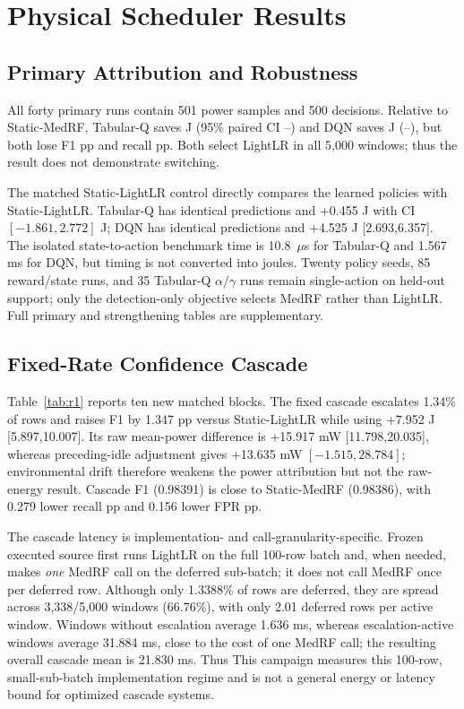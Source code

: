\section{Physical Scheduler Results}
\subsection{Primary Attribution and Robustness}
All forty primary runs contain 501 power samples and 500 decisions. Relative to Static-MedRF, Tabular-Q saves \TQSavingJ{} J (95\% paired CI \TQSavingJLow{}--\TQSavingJHigh{}) and DQN saves \DQSavingJ{} J (\DQSavingJLow{}--\DQSavingJHigh{}), but both lose \TQFOneDropPP{} F1 pp and \TQRecallDropPP{} recall pp. Both select LightLR in all 5,000 windows; thus the result does not demonstrate switching.

The matched Static-LightLR control directly compares the learned policies with Static-LightLR. Tabular-Q has identical predictions and +0.455 J with CI $[-1.861,2.772]$ J; DQN has identical predictions and +4.525 J [2.693,6.357]. The isolated state-to-action benchmark time is 10.8~$\mu$s for Tabular-Q and 1.567 ms for DQN, but timing is not converted into joules. Twenty policy seeds, 85 reward/state runs, and 35 Tabular-Q $\alpha/\gamma$ runs remain single-action on held-out support; only the detection-only objective selects MedRF rather than LightLR. Full primary and strengthening tables are supplementary.

\subsection{Fixed-Rate Confidence Cascade}
Table~\ref{tab:r1} reports ten new matched blocks. The fixed cascade escalates 1.34\% of rows and raises F1 by 1.347 pp versus Static-LightLR while using +7.952 J [5.897,10.007]. Its raw mean-power difference is +15.917 mW [11.798,20.035], whereas preceding-idle adjustment gives +13.635 mW $[-1.515,28.784]$; environmental drift therefore weakens the power attribution but not the raw-energy result. Cascade F1 (0.98391) is close to Static-MedRF (0.98386), with 0.279 lower recall pp and 0.156 lower FPR pp.

The cascade latency is implementation- and call-granularity-specific. Frozen executed source first runs LightLR on the full 100-row batch and, when needed, makes \emph{one} MedRF call on the deferred sub-batch; it does not call MedRF once per deferred row. Although only 1.3388\% of rows are deferred, they are spread across 3,338/5,000 windows (66.76\%), with only 2.01 deferred rows per active window. Windows without escalation average 1.636 ms, whereas escalation-active windows average 31.884 ms, close to the cost of one MedRF call; the resulting overall cascade mean is 21.830 ms. Thus This campaign measures this 100-row, small-sub-batch implementation regime and is not a general energy or latency bound for optimized cascade systems.

